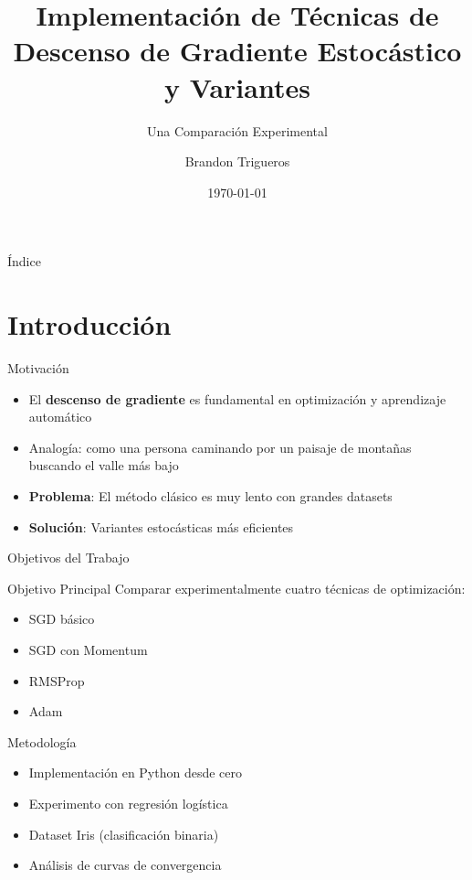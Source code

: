\documentclass[10pt]{beamer}
\title[Optimizadores de Gradiente]{Implementación de Técnicas de Descenso de Gradiente Estocástico y Variantes}
\subtitle{Una Comparación Experimental}
\author[Trigueros]{Brandon Trigueros}
\institute[Universidad de Costa Ricas]{Facultad de Ingeniería\\Universidad de Costa Rica}
\date{\today}
\begin{document}
\begin{frame}
\titlepage
\end{frame}

\begin{frame}{Índice}
\tableofcontents
\end{frame}

\section{Introducción}

\begin{frame}{Motivación}
\begin{itemize}
\item El \textbf{descenso de gradiente} es fundamental en optimización y aprendizaje automático
\item Analogía: como una persona caminando por un paisaje de montañas buscando el valle más bajo
\item \textbf{Problema}: El método clásico es muy lento con grandes datasets
\item \textbf{Solución}: Variantes estocásticas más eficientes
\end{itemize}

\begin{center}
\end{center}
\end{frame}

\begin{frame}{Objetivos del Trabajo}
\begin{block}{Objetivo Principal}
Comparar experimentalmente cuatro técnicas de optimización:
\begin{itemize}
\item SGD básico
\item SGD con Momentum  
\item RMSProp
\item Adam
\end{itemize}
\end{block}

\begin{block}{Metodología}
\begin{itemize}
\item Implementación en Python desde cero
\item Experimento con regresión logística
\item Dataset Iris (clasificación binaria)
\item Análisis de curvas de convergencia
\end{itemize}
\end{block}
\end{frame}
\end{document}
